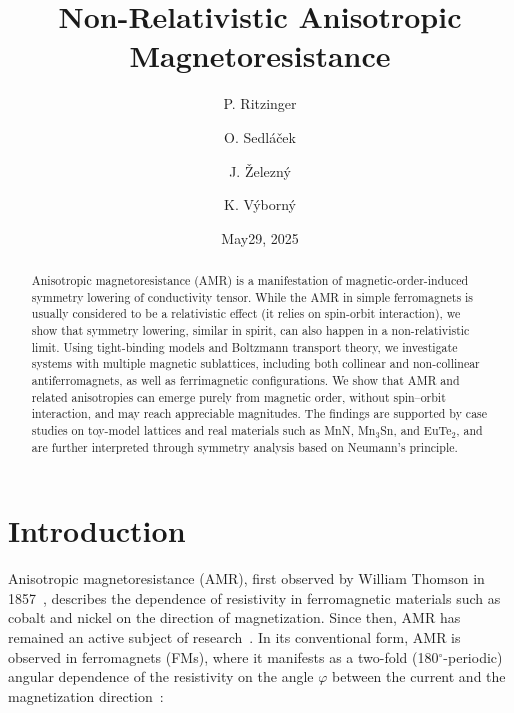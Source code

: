 \documentclass[prb,showpacs,amsmath,amssymb,superscriptaddress,twocolumn,floatfix]{revtex4-1}
\begin{document}
\title{Non-Relativistic Anisotropic Magnetoresistance}

\author{P. Ritzinger}

\author{O. Sedl\'a\v cek}
\author{J. \v Zelezn\'y}

\author{K. V\'yborn\'y}


\date{May29, 2025}

\begin{abstract}
Anisotropic magnetoresistance (AMR) is a manifestation of
magnetic-order-induced symmetry lowering of conductivity tensor. While the AMR in simple ferromagnets is usually considered to be a relativistic effect (it relies on spin-orbit interaction), we show that symmetry lowering, similar in spirit, can also happen in a non-relativistic limit. Using tight-binding models and Boltzmann transport theory, we investigate systems with multiple magnetic sublattices, including both collinear and non-collinear antiferromagnets, as well as ferrimagnetic configurations. We show that AMR and related anisotropies can emerge purely from magnetic order, without spin–orbit interaction, and may reach appreciable magnitudes. The findings are supported by case studies on toy-model lattices and real materials such as MnN, Mn$_3$Sn, and EuTe$_2$, and are further interpreted through symmetry analysis based on Neumann’s principle.
\end{abstract}


\maketitle


\section{Introduction}

Anisotropic magnetoresistance (AMR), first observed by William Thomson in 1857~\cite{Thomson:1857}, describes the dependence of resistivity in ferromagnetic materials such as cobalt and nickel on the direction of magnetization. Since then, AMR has remained an active subject of research~\cite{Ritzinger:2023}. In its conventional form, AMR is observed in ferromagnets (FMs), where it manifests as a two-fold (180$^\circ$-periodic) angular dependence of the resistivity on the angle $\varphi$ between the current and the magnetization direction~\cite{Alagoz:2015}:
\end{document}
